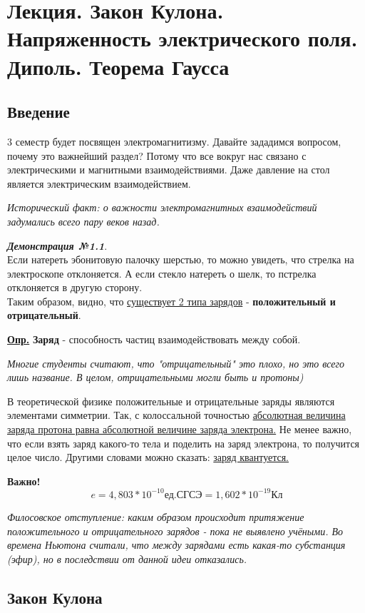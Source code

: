 \newpage
\section{Лекция. Закон Кулона. Напряженность электрического поля. Диполь. Теорема Гаусса}
\subsection{Введение}
3 семестр будет посвящен электромагнитизму. Давайте зададимся вопросом, почему это важнейший раздел? Потому что все вокруг нас связано с электрическими и магнитными взаимодействиями. Даже давление на стол является электрическим взаимодействием. 

\textit{Исторический факт: о важности электромагнитных взаимодействий задумались всего пару веков назад.}

\large
\textbf{\textit{Демонстрация №1.1}}.\\
\normalsize
Если натереть эбонитовую палочку шерстью, то можно увидеть, что стрелка на электроскопе отклоняется. А если стекло натереть о шелк, то пстрелка отклоняется в другую сторону.\\
Таким образом, видно, что \underline{существует 2 типа зарядов} - \textbf{положительный и отрицательный}.

\colorbox{faded}{\underline{\textbf{Опр.}}} \textbf{Заряд} - способность частиц взаимодействовать между собой.

\textit{Многие студенты считают, что "отрицательный" это плохо, но это всего лишь название. В целом, отрицательными могли быть и протоны)}

В теоретической физике положительные и отрицательные заряды являются элементами симметрии. Так, с колоссальной точностью \underline{абсолютная величина заряда протона равна абсолютной величине заряда электрона.} Не менее важно, что если взять заряд какого-то тела и поделить на заряд электрона, то получится целое число. Другими словами можно сказать: \underline{заряд квантуется.}

\textbf{Важно!} 
$$e = 4,803*10^{-10} \text{ед.СГСЭ} = 1,602*10^{-19} \text{Кл}$$

\textit{Филосовское отступление: каким образом происходит притяжение положительного и отрицательного зарядов - пока не выявлено учёными. Во времена Ньютона считали, что между зарядами есть какая-то субстанция (эфир), но в последствии от данной идеи отказались.}

\newpage

\subsection{Закон Кулона}

